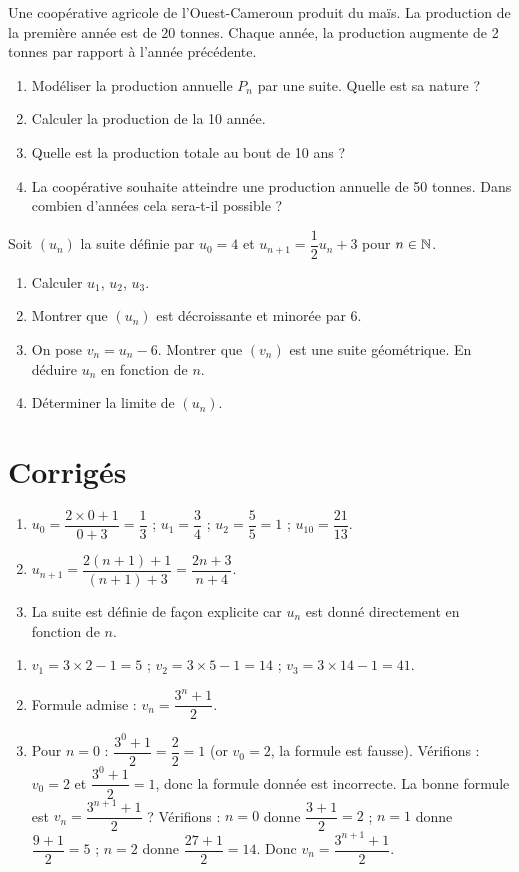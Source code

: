 Une coopérative agricole de l'Ouest-Cameroun produit du maïs. La production de la première année est de 20 tonnes. Chaque année, la production augmente de 2 tonnes par rapport à l'année précédente.
\begin{enumerate}[label=\arabic*)]
\item Modéliser la production annuelle $P_n$ par une suite. Quelle est sa nature ?
\item Calculer la production de la 10 année.
\item Quelle est la production totale au bout de 10 ans ?
\item La coopérative souhaite atteindre une production annuelle de 50 tonnes. Dans combien d'années cela sera-t-il possible ?
\end{enumerate}

Soit $(u_n)$ la suite définie par $u_0 = 4$ et $u_{n+1} = \dfrac{1}{2}u_n + 3$ pour $n\in\mathbb{N}$.
\begin{enumerate}[label=\arabic*)]
\item Calculer $u_1$, $u_2$, $u_3$.
\item Montrer que $(u_n)$ est décroissante et minorée par 6.
\item On pose $v_n = u_n - 6$. Montrer que $(v_n)$ est une suite géométrique. En déduire $u_n$ en fonction de $n$.
\item Déterminer la limite de $(u_n)$.
\end{enumerate}

\section{Corrigés}

\begin{enumerate}[label=\alph*)]
\item $u_0 = \dfrac{2\times0+1}{0+3} = \dfrac{1}{3}$ ; $u_1 = \dfrac{3}{4}$ ; $u_2 = \dfrac{5}{5}=1$ ; $u_{10} = \dfrac{21}{13}$.
\item $u_{n+1} = \dfrac{2(n+1)+1}{(n+1)+3} = \dfrac{2n+3}{n+4}$.
\item La suite est définie de façon explicite car $u_n$ est donné directement en fonction de $n$.
\end{enumerate}

\begin{enumerate}[label=\alph*)]
\item $v_1 = 3\times2 - 1 = 5$ ; $v_2 = 3\times5 - 1 = 14$ ; $v_3 = 3\times14 - 1 = 41$.
\item Formule admise : $v_n = \dfrac{3^n + 1}{2}$.
\item Pour $n=0$ : $\dfrac{3^0+1}{2} = \dfrac{2}{2}=1$ (or $v_0=2$, la formule est fausse). Vérifions : $v_0=2$ et $\dfrac{3^0+1}{2}=1$, donc la formule donnée est incorrecte. La bonne formule est $v_n = \dfrac{3^{n+1}+1}{2}$ ? Vérifions : $n=0$ donne $\dfrac{3+1}{2}=2$ ; $n=1$ donne $\dfrac{9+1}{2}=5$ ; $n=2$ donne $\dfrac{27+1}{2}=14$. Donc $v_n = \dfrac{3^{n+1}+1}{2}$.
\end{enumerate}


